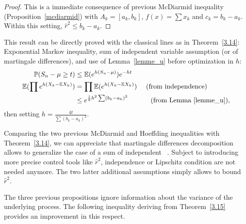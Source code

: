 \begin{proof}
 This is a immediate consequence of previous McDiarmid inequality (Proposition~\ref{mcdiarmid}) with $A_k=[a_k,b_k]$, $f(x)=\sum x_k$ and $c_k=b_k-a_k $. Within this setting, $\hat r^2 \leq b_k-a_k$.
\end{proof}

\begin{remark} 
This result can be directly proved with the classical lines as in Theorem~\ref{3.14}: Exponential Markov inequality, sum of independent variable assumption (or of martingale differences), and use of Lemma~\ref{lemme_u} before optimization in $h$:
\begin{align*} 
\mathbb{P}(S_n-\mu \geq t) &\leq \mathbb{E}(e^{h(S_n-\mu)})e^{-ht}\\
\mathbb{E}(\prod e^{h(X_k-\mathbb{E}X_k)})&=\prod \mathbb{E}(e^{h(X_k-\mathbb{E}X_k)})\mbox{~~~~(from independence)}\\
&\leq e^{\frac{1}{8}h^2\sum(b_k-a_k)^2} \mbox{~~~~~~~~~~(from Lemma~\ref{lemme_u})},
\end{align*}
then setting $h=\frac{4t}{\sum(b_k-a_k)^2}$.
\end{remark}

\begin{remark}
Comparing the two previous McDiarmid and Hoeffding inequalities with Theorem~\ref{3.14}, we can appreciate that martingale differences decomposition allows to generalize the case of a sum of independent \rv~.
Subject to introducing more precise control tools like  $\hat r^2$, independence or Lipschitz condition are not needed anymore.
The two latter additional assumptions simply allows to bound $\hat r^2$.
\end{remark}

The three previous propositions ignore information about the variance of the underlying process. The following inequality deriving from Theorem~\ref{3.15} provides an improvement in this respect.

